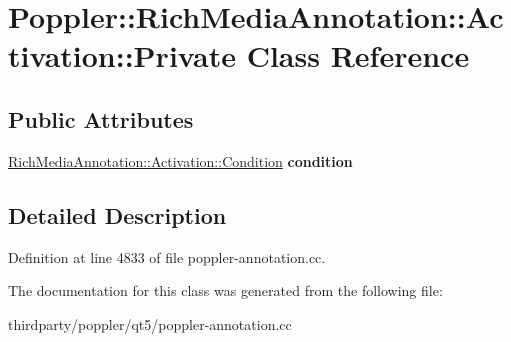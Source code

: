\hypertarget{class_poppler_1_1_rich_media_annotation_1_1_activation_1_1_private}{}\section{Poppler\+:\+:Rich\+Media\+Annotation\+:\+:Activation\+:\+:Private Class Reference}
\label{class_poppler_1_1_rich_media_annotation_1_1_activation_1_1_private}
\subsection*{Public Attributes}
\begin{DoxyCompactItemize}
\item 
\mbox{\label{class_poppler_1_1_rich_media_annotation_1_1_activation_1_1_private_a1cc730a851d77e020e2c70a667fb3a77}} 
\hyperlink{class_poppler_1_1_rich_media_annotation_1_1_activation_a6bd1a04f2b4b84df639ba04ea08b5f85}{Rich\+Media\+Annotation\+::\+Activation\+::\+Condition} {\bfseries condition}
\end{DoxyCompactItemize}


\subsection{Detailed Description}


Definition at line 4833 of file poppler-\/annotation.\+cc.



The documentation for this class was generated from the following file\+:\begin{DoxyCompactItemize}
\item 
thirdparty/poppler/qt5/poppler-\/annotation.\+cc\end{DoxyCompactItemize}
